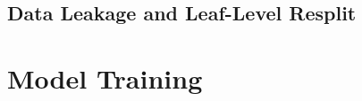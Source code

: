 \subsection{Data Leakage and Leaf-Level Resplit}
\label{sec:leakage}
%
%
%
%

\section{Model Training}
\label{sec:training}

